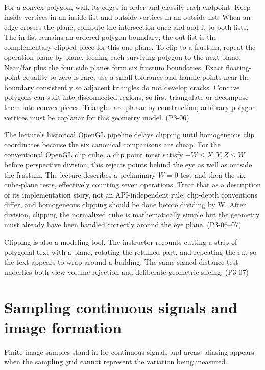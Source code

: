 For a convex polygon, walk its edges in order and classify each endpoint. Keep inside vertices in an inside list and outside vertices in an outside list. When an edge crosses the plane, compute the intersection once and add it to both lists. The in-list remains an ordered polygon boundary; the out-list is the complementary clipped piece for this one plane. To clip to a frustum, repeat the operation plane by plane, feeding each surviving polygon to the next plane. Near/far plus the four side planes form six frustum boundaries. Exact floating-point equality to zero is rare; use a small tolerance and handle points near the boundary consistently so adjacent triangles do not develop cracks. Concave polygons can split into disconnected regions, so first triangulate or decompose them into convex pieces. Triangles are planar by construction; arbitrary polygon vertices must be coplanar for this geometry model. (P3-06)

The lecture's historical OpenGL pipeline delays clipping until homogeneous clip coordinates because the six canonical comparisons are cheap. For the conventional OpenGL clip cube, a clip point must satisfy \(-W\le X,Y,Z\le W\) before perspective division; this rejects points behind the eye as well as outside the frustum. The lecture describes a preliminary \(W=0\) test and then the six cube-plane tests, effectively counting seven operations. Treat that as a description of its implementation story, not an API-independent rule: clip-depth conventions differ, and \hyperref[appendix-40426e4b2103]{homogeneous clipping} should be done before dividing by W. After division, clipping the normalized cube is mathematically simple but the geometry must already have been handled correctly around the eye plane. (P3-06--07)

Clipping is also a modeling tool. The instructor recounts cutting a strip of polygonal text with a plane, rotating the retained part, and repeating the cut so the text appears to wrap around a building. The same signed-distance test underlies both view-volume rejection and deliberate geometric slicing. (P3-07)

\section{Sampling continuous signals and image formation}\label{03-visual-computing-i-ch003-sampling-continuous-signals-and-image-formation}

Finite image samples stand in for continuous signals and areas; aliasing appears when the sampling grid cannot represent the variation being measured.

